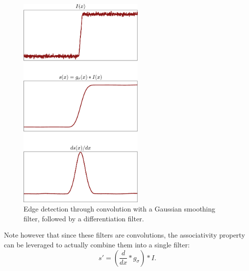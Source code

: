 \begin{figure}[ht!]
  \centering
  \includegraphics[width=0.55\textwidth]{tex/figs/ch11_figs/edge_detection_smooth.png}
    \caption{Edge detection through convolution with a Gaussian smoothing filter, followed by a differentiation filter.}
    \label{fig:gauss}
\end{figure}
Note however that since these filters are convolutions, the associativity property can be leveraged to actually combine them into a single filter:
\begin{equation*}
s'=(\frac{d}{dx} * g_\sigma) * I.
\end{equation*}

